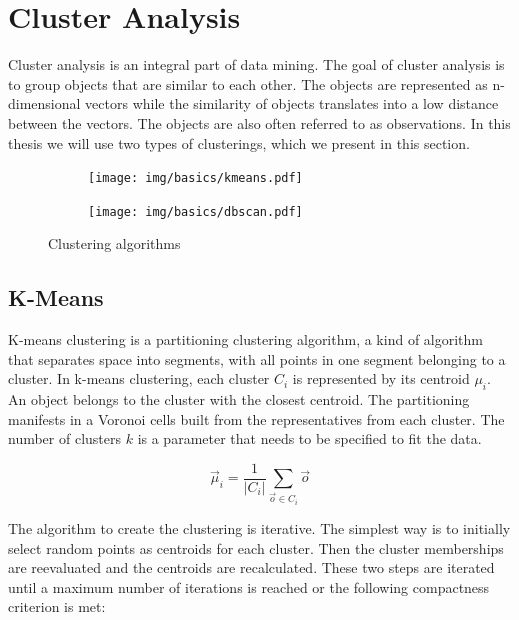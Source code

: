 \documentclass[pdftex,12pt,a4paper]{report}
\begin{document}
\section{Cluster Analysis}

Cluster analysis is an integral part of data mining. The goal of cluster analysis is to group objects that are similar to each other. The objects are represented as n-dimensional vectors while the similarity of objects translates into a low distance between the vectors. The objects are also often referred to as observations. In this thesis we will use two types of clusterings, which we present in this section.

\begin{figure}[h]
	\centering
	\begin{subfigure}[b]{0.45\textwidth}
		\centering
		\texttt{[image: img/basics/kmeans.pdf]}
		\label{fig:basics-clustering-k-means}
	\end{subfigure}
	\begin{subfigure}[b]{0.45\textwidth}
		\centering
		\texttt{[image: img/basics/dbscan.pdf]}
		\label{fig:basics-clustering-dbscan}
	\end{subfigure}
	\caption{Clustering algorithms}
	\label{fig:basics-clustering}
\end{figure}

\subsection{K-Means}

K-means clustering is a partitioning clustering algorithm, a kind of algorithm that separates space into segments, with all points in one segment belonging to a cluster. In k-means clustering, each cluster $C_i$ is represented by its centroid $\mu_i$. An object belongs to the cluster with the closest centroid. The partitioning manifests in a Voronoi cells built from the representatives from each cluster. The number of clusters $k$ is a parameter that needs to be specified to fit the data.

\begin{equation}
\vec{\mu}_i = \frac{1}{|C_i|} \sum_{\vec{o} \in C_i}\vec{o}
\end{equation}

The algorithm to create the clustering is iterative. The simplest way is to initially select random points as centroids for each cluster. Then the cluster memberships are reevaluated and the centroids are recalculated. These two steps are iterated until a maximum number of iterations is reached or the following compactness criterion is met:
\end{document}
